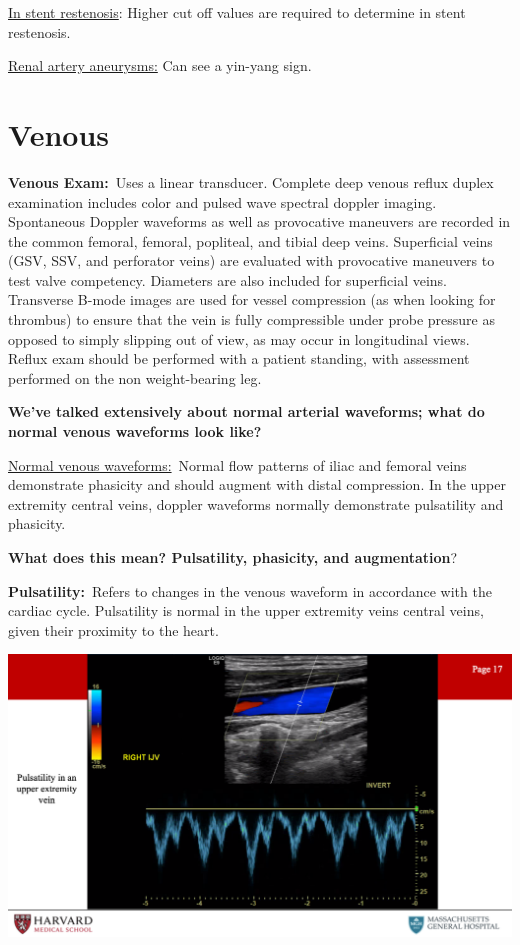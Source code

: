 \documentclass[
]{book}
\begin{document}
\uline{In stent restenosis}: Higher cut off values are required to
determine in stent restenosis.\citep{chi2009, schäberle2016}

\uline{Renal artery aneurysms:} Can see a yin-yang sign.
\citep{gutta2008, ham2014}

\hypertarget{venous}{%
\section{Venous}\label{venous}}

\textbf{Venous Exam:}~Uses a linear transducer. Complete deep venous reflux
duplex examination includes color and pulsed wave spectral doppler
imaging. Spontaneous Doppler waveforms as well as provocative maneuvers
are recorded in the common femoral, femoral, popliteal, and tibial deep
veins. Superficial veins (GSV, SSV, and perforator veins) are evaluated
with provocative maneuvers to test valve competency. Diameters are also
included for superficial veins. Transverse B-mode images are used for
vessel compression (as when looking for thrombus) to ensure that the
vein is fully compressible under probe pressure as opposed to simply
slipping out of view, as may occur in longitudinal views. Reflux exam
should be performed with a patient standing, with assessment performed
on the non weight-bearing leg.

\textbf{We've talked extensively about normal arterial waveforms; what do
normal venous waveforms look like?}

\uline{Normal venous waveforms:}~Normal flow patterns of iliac and
femoral veins demonstrate phasicity and should augment with distal
compression. In the upper extremity central veins, doppler waveforms
normally demonstrate pulsatility and phasicity.

\textbf{What does this mean? Pulsatility, phasicity, and augmentation}?

\textbf{Pulsatility:}~Refers to changes in the venous waveform in accordance
with the cardiac cycle. Pulsatility is normal in the upper extremity
veins central veins, given their proximity to the heart.

\includegraphics[width=15.01in]{images/vasc_lab2/Slide18}
\end{document}
